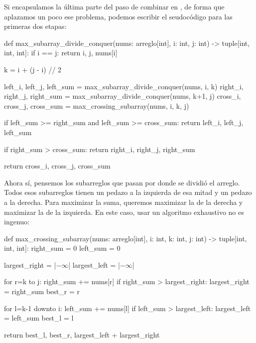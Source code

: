 Si encapsulamos la última parte del paso de combinar en , de forma que aplazamos un poco ese problema, podemos escribir el seudocódigo para las primeras dos etapas:
\begin{pseudocode}
def max_subarray_divide_conquer(nums: arreglo[int], i: int, j: int) -> tuple[int, int, int]:
    if i == j: return i, j, nums[i]

    k = i + (j - i) // 2

    left_i, left_j, left_sum = max_subarray_divide_conquer(nums, i, k)
    right_i, right_j, right_sum = max_subarray_divide_conquer(nums, k+1, j)
    cross_i, cross_j, cross_sum = max_crossing_subarray(nums, i, k, j)

    if left_sum >= right_sum and left_sum >= cross_sum:
        return left_i, left_j, left_sum

    if right_sum > cross_sum:
        return right_i, right_j, right_sum

    return cross_i, cross_j, cross_sum
\end{pseudocode}

Ahora sí, pensemos los subarreglos que pasan por donde se dividió el arreglo. Todos esos subarreglos tienen un pedazo a la izquierda de esa mitad y un pedazo a la derecha. Para maximizar la suma, queremos maximizar la de la derecha y maximizar la de la izquierda. En este caso, usar un algoritmo exhaustivo no es ingenuo:
\begin{pseudocode}
def max_crossing_subarray(nums: arreglo[int], i: int, k: int, j: int) -> tuple[int, int, int]:
    right_sum = 0
    left_sum = 0

    largest_right = |$-\infty$|
    largest_left = |$-\infty$|

    for r=k to j:
        right_sum += nums[r]
        if right_sum > largest_right:
            largest_right = right_sum
            best_r = r

    for l=k-1 downto i:
        left_sum += nums[l]
        if left_sum > largest_left:
            largest_left = left_sum
            best_l = l

    return best_l, best_r, largest_left + largest_right
\end{pseudocode}



